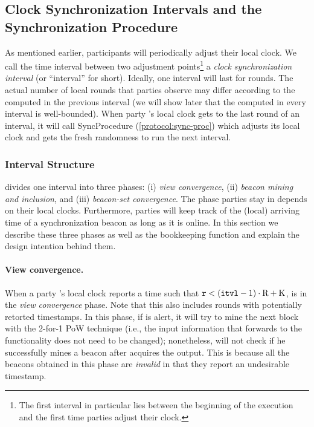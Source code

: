 \subsection{Clock Synchronization Intervals and the Synchronization Procedure}
\label{subsec:intervals-and-sync-procedure}

As mentioned earlier, \timekeeper participants will periodically adjust their local clock.
%
We call the time interval between two adjustment points\footnote{The first interval in particular lies between the beginning of the execution and the first time parties adjust their clock.} a \emph{clock synchronization interval} (or ``interval'' for short).
%
Ideally, one interval will last for \syncLen rounds.
%
The actual number of local rounds that parties observe may differ according to the \shift computed in the previous interval (we will show later that the \shift computed in every interval is well-bounded).
%
When party \party's local clock gets to the last round of an interval, it will call \textsf{SyncProcedure} (\cref{protocol:sync-proc}) which adjusts its local clock and gets the fresh randomness to run the next interval.

\subsubsection{Interval Structure}
\label{subsubsec:interval-structure}

\timekeeper divides one interval into three phases: (i) \emph{view convergence}, (ii) \emph{beacon mining and inclusion}, and (iii) \emph{beacon-set convergence}.
%
The phase parties stay in depends on their local clocks.
%
Furthermore, parties will keep track of the (local) arriving time of a synchronization beacon as long as it is online.
%
In this section we describe these three phases as well as the bookkeeping function and explain the design intention behind them.

\paragraph{View convergence.}
%
When a party \party's local clock reports a time \protocolTime{\interval}{\round} such that $\mathtt{r} < (\mathtt{itvl} - 1) \cdot \mathrm{R} + \mathrm{K}$, \party is in the \emph{view convergence} phase.
%
Note that this also includes rounds with potentially retorted timestamps.
%
In this phase, if \party is alert, it will try to mine the next block with the 2-for-1 PoW technique (i.e., the input information that \party forwards to the \funcRO functionality does not need to be changed); nonetheless, \party will not check if he successfully mines a beacon after \party acquires the output.
%
This is because all the beacons obtained in this phase are \emph{invalid} in that they report an undesirable timestamp.

